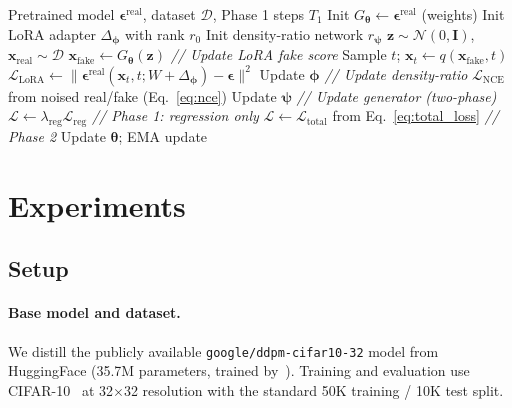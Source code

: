 \documentclass{article}
\theoremstyle{plain}
\theoremstyle{remark}
\newcommand{\bx}{\mathbf{x}}
\newcommand{\bz}{\mathbf{z}}
\newcommand{\bepsilon}{\boldsymbol{\epsilon}}
\newcommand{\btheta}{\boldsymbol{\theta}}
\newcommand{\bphi}{\boldsymbol{\phi}}
\newcommand{\bpsi}{\boldsymbol{\psi}}
\begin{document}
\begin{algorithm}[t]
\caption{AdaDMD Training}
\label{alg:adadmd}
\begin{algorithmic}[1]
\REQUIRE Pretrained model $\bepsilon^{\text{real}}$, dataset $\mathcal{D}$, Phase 1 steps $T_1$
\STATE Init $G_{\btheta} \leftarrow \bepsilon^{\text{real}}$ (weights)
\STATE Init LoRA adapter $\Delta_{\bphi}$ with rank $r_0$
\STATE Init density-ratio network $r_{\bpsi}$
    \STATE $\bz \sim \mathcal{N}(0, \mathbf{I})$, $\bx_{\text{real}} \sim \mathcal{D}$
    \STATE $\bx_{\text{fake}} \leftarrow G_{\btheta}(\bz)$
    \STATE \textit{// Update LoRA fake score}
    \STATE Sample $t$; $\bx_t \leftarrow q(\bx_{\text{fake}}, t)$
    \STATE $\mathcal{L}_{\text{LoRA}} \leftarrow \|\bepsilon^{\text{real}}(\bx_t, t; W + \Delta_{\bphi}) - \bepsilon\|^2$
    \STATE Update $\bphi$
    \STATE \textit{// Update density-ratio}
    \STATE $\mathcal{L}_{\text{NCE}}$ from noised real/fake (Eq.~\ref{eq:nce})
    \STATE Update $\bpsi$
    \STATE \textit{// Update generator (two-phase)}
        \STATE $\mathcal{L} \leftarrow \lambda_{\text{reg}} \mathcal{L}_{\text{reg}}$ \quad\textit{// Phase 1: regression only}
    \ELSE
        \STATE $\mathcal{L} \leftarrow \mathcal{L}_{\text{total}}$ from Eq.~\ref{eq:total_loss} \quad\textit{// Phase 2}
    \ENDIF
    \STATE Update $\btheta$; EMA update
\ENDFOR
\end{algorithmic}
\end{algorithm}

\section{Experiments}
\label{sec:experiments}

\subsection{Setup}

\paragraph{Base model and dataset.}
We distill the publicly available \texttt{google/ddpm-cifar10-32} model from HuggingFace (35.7M parameters, trained by~\citet{ho2020denoising}). Training and evaluation use CIFAR-10~\citep{krizhevsky2009learning} at 32$\times$32 resolution with the standard 50K training / 10K test split.
\end{document}
